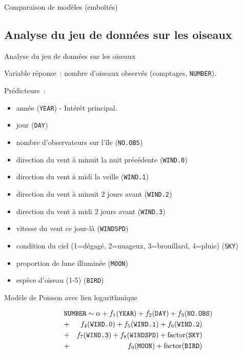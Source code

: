 \documentclass{BeamerTemplate}
\begin{document}
\begin{refsection}
\begin{frame}{Comparaison de modèles (emboîtés)}
\end{frame}

\subsection{Analyse du jeu de données sur les oiseaux}
\begin{frame}{Analyse du jeu de données sur les oiseaux}

Variable réponse~: nombre d'oiseaux observés (comptages, \texttt{NUMBER}).

\bigskip
Prédicteurs~:
\begin{itemize}
\item année (\texttt{YEAR})  - {\color{blue}Intérêt principal}.
\item jour (\texttt{DAY}) 
\item nombre
d'observateurs sur l'île (\texttt{NO.OBS}) 
\item direction du vent à minuit la nuit précédente (\texttt{WIND.0}) 
\item direction du vent à midi la veille (\texttt{WIND.1}) 
\item direction du vent à minuit 2 jours avant (\texttt{WIND.2}) 
\item direction du vent à midi 2 jours avant (\texttt{WIND.3}) 
\item vitesse du vent ce jour-là (\texttt{WINDSPD}) 
\item condition du ciel (1=dégagé, 2=nuageux, 3=brouillard, 4=pluie) (\texttt{SKY})
\item proportion de lune illuminée (\texttt{MOON}) 
\item espèce d'oiseau (1-5) (\texttt{BIRD})
\end{itemize}

\end{frame}


\begin{frame}[fragile]{Modèle de Poisson avec lien logarithmique}

\begin{eqnarray*}
\lefteqn{\texttt{NUMBER} \sim  \alpha + f_1(\texttt{YEAR}) + f_2(\texttt{DAY}) +
f_3(\texttt{NO.OBS})} \\
& + & f_4(\texttt{WIND.0}) + f_5(\texttt{WIND.1}) +
f_6(\texttt{WIND.2}) \\
& + & f_7(\texttt{WIND.3}) + f_8(\texttt{WINDSPD}) +
\mbox{factor(\texttt{SKY})}\\
& + & f_9(\texttt{MOON}) + \mbox{factor}(\texttt{BIRD})
\end{eqnarray*}


\end{frame}
\end{refsection}
\end{document}
